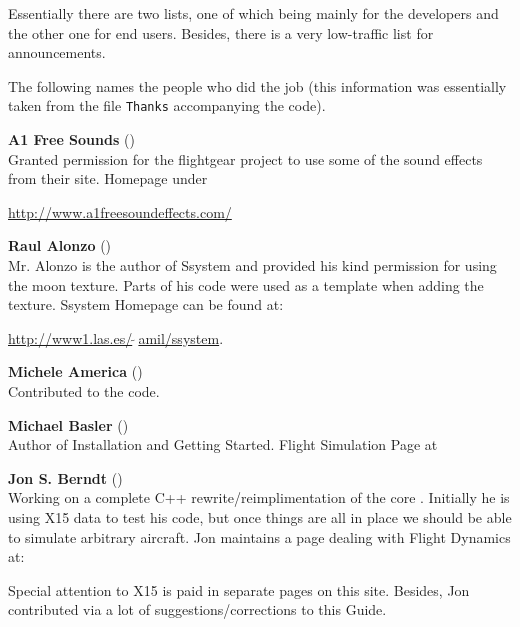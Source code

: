 \noindent
 Essentially there are two lists, one of which being mainly for the developers
and the other one for end users. Besides, there is a very low-traffic list for
announcements.
\medskip

 \noindent
The following names the people who did the job (this information was essentially taken
from the file \texttt{Thanks} accompanying the code).
 \medskip

\noindent \textbf{A1 Free Sounds} ()\\
   Granted permission for the flightgear project to use some of the sound effects from their  
   site. Homepage under   
   \medskip
   
   \href{http://www.a1freesoundeffects.com/}{http://www.a1freesoundeffects.com/}
   \medskip

\noindent \textbf{Raul Alonzo} ()\\
   Mr. Alonzo is the
 author of Ssystem and provided his kind permission for using the moon texture.
 Parts of his code were used as a template when adding the texture.
  Ssystem Homepage can be found at:
   \medskip

  \href{http://www1.las.es/~amil/ssystem}{http://www1.las.es/$\tilde{~~}$amil/ssystem}.
 \medskip

 \noindent \textbf{Michele America}
()\\
  Contributed to the  code.
 \medskip

\noindent \textbf{Michael Basler} ()\\
 Author of Installation and Getting Started. Flight Simulation Page at
  \medskip

\medskip

\noindent \textbf{Jon S. Berndt} ()\\
 Working on a complete C++ rewrite/reimplimentation of the core .
  Initially he is using X15 data to test his code, but once things are
  all in place we should be able to simulate arbitrary aircraft. Jon
  maintains a page dealing with Flight Dynamics at:
   \medskip

   \medskip

\noindent
  Special attention to X15 is paid in separate pages on this site. Besides, Jon
  contributed via a lot of suggestions/corrections to this Guide.
\medskip

